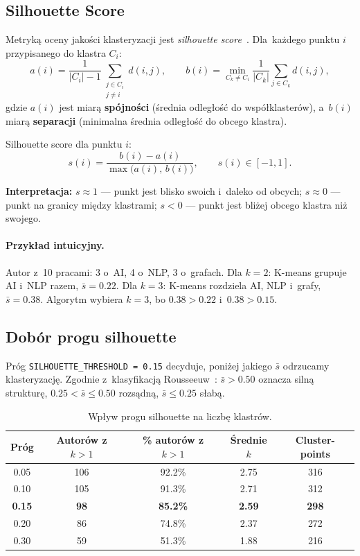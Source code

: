 \documentclass[a4paper,11pt]{article}
\begin{document}
\subsection{Silhouette Score}

Metryką oceny jakości klasteryzacji jest \emph{silhouette score}~\cite{rousseeuw1987}.
Dla~każdego punktu $i$ przypisanego do klastra $C_i$:
\begin{equation}
a(i) = \frac{1}{|C_i|-1} \sum_{\substack{j \in C_i \\ j \neq i}} d(i,j), \qquad
b(i) = \min_{C_k \neq C_i} \frac{1}{|C_k|} \sum_{j \in C_k} d(i,j),
\end{equation}
gdzie $a(i)$ jest miarą \textbf{spójności} (średnia odległość do współklasterów), a~$b(i)$ miarą \textbf{separacji} (minimalna średnia odległość do obcego klastra).

Silhouette score dla punktu $i$:
\begin{equation}
s(i) = \frac{b(i) - a(i)}{\max\bigl(a(i),\, b(i)\bigr)}, \qquad s(i) \in [-1, 1].
\end{equation}

\textbf{Interpretacja:}
$s \approx 1$ --- punkt jest blisko swoich i~daleko od obcych;
$s \approx 0$ --- punkt na granicy między klastrami;
$s < 0$ --- punkt jest bliżej obcego klastra niż swojego.

\paragraph{Przykład intuicyjny.}
Autor z~10 pracami: 3 o~AI, 4 o~NLP, 3 o~grafach.
Dla $k{=}2$: K-means grupuje AI i~NLP razem, $\bar{s} = 0.22$.
Dla $k{=}3$: K-means rozdziela AI, NLP i~grafy, $\bar{s} = 0.38$.
Algorytm wybiera $k{=}3$, bo $0.38 > 0.22$ i~$0.38 > 0.15$.

\subsection{Dobór progu silhouette}

Próg \texttt{SILHOUETTE\_THRESHOLD\,=\,0.15} decyduje, poniżej jakiego $\bar{s}$ odrzucamy klasteryzację.
Zgodnie z~klasyfikacją Rousseeuw~\cite{rousseeuw1987}: $\bar{s} > 0.50$ oznacza silną strukturę, $0.25 < \bar{s} \leq 0.50$ rozsądną, $\bar{s} \leq 0.25$ słabą.

\begin{table}[H]
\centering
\caption{Wpływ progu silhouette na liczbę klastrów.}
\label{tab:threshold}
\begin{tabular}{ccccc}
\toprule
Próg & Autorów z $k{>}1$ & \% autorów z $k{>}1$ & Średnie $k$ & Cluster-points \\
\midrule
0.05 & 106 & 92.2\% & 2.75 & 316 \\
0.10 & 105 & 91.3\% & 2.71 & 312 \\
\textbf{0.15} & \textbf{98} & \textbf{85.2\%} & \textbf{2.59} & \textbf{298} \\
0.20 & 86 & 74.8\% & 2.37 & 272 \\
0.30 & 59 & 51.3\% & 1.88 & 216 \\
\bottomrule
\end{tabular}
\end{table}
\end{document}
